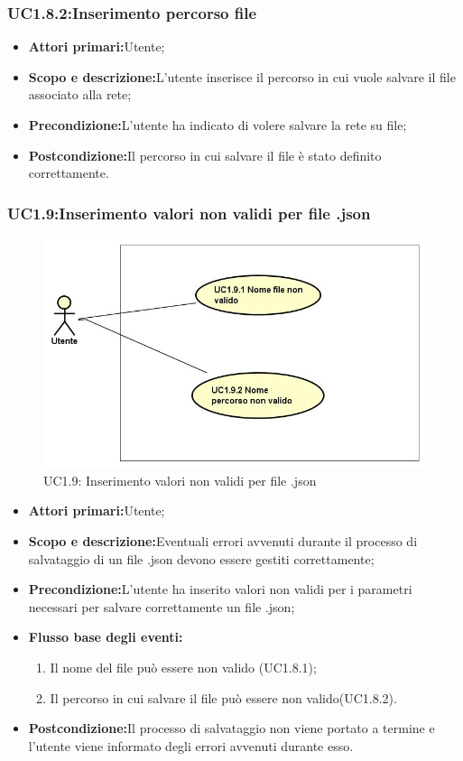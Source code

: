 \subsubsection{UC1.8.2:Inserimento percorso file}
\begin{itemize}
	\item{\textbf{Attori primari:}Utente;}
	\item{\textbf{Scopo e descrizione:}L'utente inserisce il percorso in cui vuole salvare il file associato alla rete;}
	\item{\textbf{Precondizione:}L'utente ha indicato di volere salvare la rete su file;}
	\item{\textbf{Postcondizione:}Il percorso in cui salvare il file è stato definito correttamente.}
\end{itemize}
\subsubsection{UC1.9:Inserimento valori non validi per file .json}
\begin{figure} [H]
	\centering
	\includegraphics[scale=0.45]{Img/UC1-9}
	\caption{UC1.9: Inserimento valori non validi per file .json}\label{}
\end{figure}
\begin{itemize}
	\item{\textbf{Attori primari:}Utente;}
	\item{\textbf{Scopo e descrizione:}Eventuali errori avvenuti durante il processo di salvataggio di un file .json devono essere gestiti correttamente;}
	\item{\textbf{Precondizione:}L'utente ha inserito valori non validi per i parametri necessari per salvare correttamente un file .json;}
	\item{\textbf{Flusso base degli eventi:}}
	\begin{enumerate}
		\item{Il nome del file può essere non valido (UC1.8.1);}
		\item{Il percorso in cui salvare il file può essere non valido(UC1.8.2).}
	\end{enumerate}
	\item{\textbf{Postcondizione:}Il processo di salvataggio non viene portato a termine e l'utente viene informato degli errori avvenuti durante esso.}
\end{itemize}
